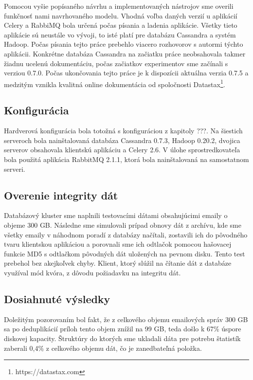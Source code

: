 \documentclass[11pt,twoside,a4paper]{book}
\begin{document}
Pomocou vyšie popísaného návrhu a implementovaných nástrojov sme overili funkčnosť nami navrhovaného modelu. Vhodná voľba daných verzií u aplikácií Celery a RabbiMQ bola určená počas písania a ladenia aplikácie. Všetky tieto aplikácie sú neustále vo vývoji, to isté platí pre databázu Cassandra a systém Hadoop. Počas písania tejto práce prebehlo viacero rozhovorov s autormi týchto aplikácii. Konkrétne databáza Cassandra na začiatku práce neobsahovala takmer žiadnu ucelenú dokumentáciu, počas začiatkov experimentov sme začínali s verziou 0.7.0. Počas ukončovania tejto práce je k dispozícii aktuálna verzia 0.7.5 a medzitým vznikla kvalitná online dokumentácia od spoločnosti Datastax\footnote{https://datastax.com}. 

\subsection*{Konfigurácia}
Hardverová konfigurácia bola totožná s konfiguráciou z kapitoly ???. Na šiestich serveroch bola nainštalovaná databáza Cassandra 0.7.3, Hadoop 0.20.2, dvojica serverov obsahovala klientskú aplikáciu a Celery 2.6. V úlohe sprostredkovateľa bola použitá aplikácia RabbitMQ 2.1.1, ktorá bola nainštalovaná na samostatnom serveri.


\subsection*{Overenie integrity dát}
Databázový kluster sme naplnili testovacími dátami obsahujúcimi emaily o objeme 300 GB. Následne sme simulovali prípad obnovy dát z archívu, kde sme všetky emaily v náhodnom poradí z databázy načítali, zostavili ich do pôvodného tvaru klientskou aplikáciou a porovnali sme ich odtlačok pomocou hašovacej funkcie MD5 s odtlačkom pôvodných dát uložených na pevnom disku. Tento test prebehol bez akejkoľvek chyby. 
Klient, ktorý slúžil na čítanie dát z databáze využíval mód kvóra, z dôvodu požiadavku na integritu dát.


\subsection*{Dosiahnuté výsledky}
Doležitým pozorovaním bol fakt, že z celkového objemu emailových správ 300 GB sa po deduplikácií príloh tento objem znížil na 99 GB, teda došlo k 67\% úspore diskovej kapacity. Štruktúry do ktorých sme ukladali dáta pre potrebu štatistík zaberali 0,4\% z celkového objemu dát, čo je zanedbateľná položka.
\end{document}
